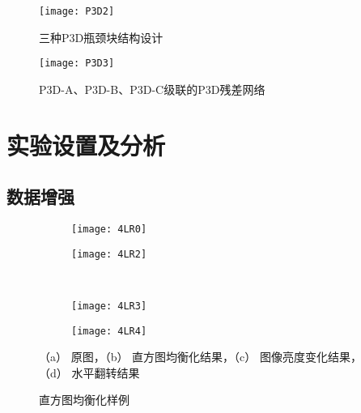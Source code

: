 \begin{figure}[!htbp]
\centering
\texttt{[image: P3D2]}
\caption{三种P3D瓶颈块结构设计}
\label{fig23}
\end{figure}

\begin{figure}[!htbp]
\centering
\texttt{[image: P3D3]}
\caption{P3D-A、P3D-B、P3D-C级联的P3D残差网络}
\label{fig24}
\end{figure}

\section{实验设置及分析}

\subsection{数据增强}

\begin{figure}[!htbp]
    \centering
    \quad
    \begin{subfigure}[b]{0.225\textwidth}
      \texttt{[image: 4LR0]}
      \caption{}
    \end{subfigure}
    \quad
    \begin{subfigure}[b]{0.25\textwidth}
      \texttt{[image: 4LR2]}
      \caption{}
    \end{subfigure}
    \\
    \begin{subfigure}[b]{0.25\textwidth}
      \texttt{[image: 4LR3]}
      \caption{}
    \end{subfigure}
    \quad
    \begin{subfigure}[b]{0.25\textwidth}
      \texttt{[image: 4LR4]}
      \caption{}
    \end{subfigure}
    \begin{spacing}{1.0}
    \caption{直方图均衡化样例}
    \label{fig21}
    \centerline{\footnotesize \textmd{（a） 原图，（b） 直方图均衡化结果，（c） 图像亮度变化结果，（d） 水平翻转结果}}
    \end{spacing}
\end{figure}



